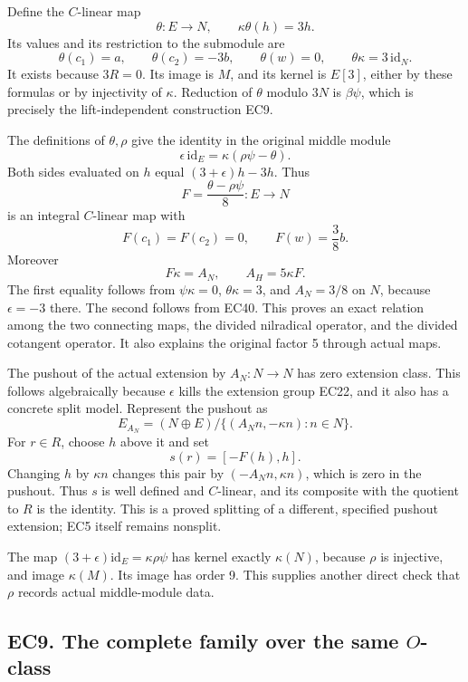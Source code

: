 \documentclass[
  10pt,
]{article}
\begin{document}
Define the \(C\)-linear map \[
\theta:E\longrightarrow N,\qquad
\kappa\theta(h)=3h.
\tag{EC38}
\] Its values and its restriction to the submodule are \[
\theta(c_1)=a,\qquad
\theta(c_2)=-3b,\qquad
\theta(w)=0,\qquad
\theta\kappa=3\,\mathrm{id}_N.
\tag{EC39}
\] It exists because \(3R=0\). Its image is \(M\), and its kernel is
\(E[3]\), either by these formulas or by injectivity of \(\kappa\).
Reduction of \(\theta\) modulo \(3N\) is \(\beta\psi\), which is
precisely the lift-independent construction EC9.

The definitions of \(\theta,\rho\) give the identity in the original
middle module \[
\epsilon\,\mathrm{id}_E=\kappa(\rho\psi-\theta).
\tag{EC40}
\] Both sides evaluated on \(h\) equal \((3+\epsilon)h-3h\). Thus \[
F=\frac{\theta-\rho\psi}{8}:E\longrightarrow N
\] is an integral \(C\)-linear map with \[
F(c_1)=F(c_2)=0,\qquad F(w)=\frac38b.
\] Moreover \[
F\kappa=A_N,\qquad A_H=5\kappa F.
\tag{EC41}
\] The first equality follows from \(\psi\kappa=0\), \(\theta\kappa=3\),
and \(A_N=3/8\) on \(N\), because \(\epsilon=-3\) there. The second
follows from EC40. This proves an exact relation among the two
connecting maps, the divided nilradical operator, and the divided
cotangent operator. It also explains the original factor 5 through
actual maps.

The pushout of the actual extension by \(A_N:N\to N\) has zero extension
class. This follows algebraically because \(\epsilon\) kills the
extension group EC22, and it also has a concrete split model. Represent
the pushout as \[
E_{A_N}=(N\oplus E)/
\{(A_Nn,-\kappa n):n\in N\}.
\] For \(r\in R\), choose \(h\) above it and set \[
s(r)=[-F(h),h].
\tag{EC42}
\] Changing \(h\) by \(\kappa n\) changes this pair by
\((-A_Nn,\kappa n)\), which is zero in the pushout. Thus \(s\) is well
defined and \(C\)-linear, and its composite with the quotient to \(R\)
is the identity. This is a proved splitting of a different, specified
pushout extension; EC5 itself remains nonsplit.

The map \((3+\epsilon)\mathrm{id}_E=\kappa\rho\psi\) has kernel exactly
\(\kappa(N)\), because \(\rho\) is injective, and image \(\kappa(M)\).
Its image has order 9. This supplies another direct check that \(\rho\)
records actual middle-module data.

\subsection{\texorpdfstring{EC9. The complete family over the same
\(O\)-class}{EC9. The complete family over the same O-class}}\label{ec9.-the-complete-family-over-the-same-o-class}
\end{document}
